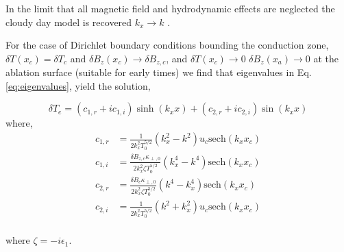 \documentclass[aip,reprint]{revtex4-1}
\begin{document}
In the limit that all magnetic field and hydrodynamic effects are neglected the cloudy day model is recovered $k_x \rightarrow k$ \cite{Bodner1974}.

For the case of Dirichlet boundary conditions bounding the conduction zone, $\delta T(x_c) = \delta T_{c}$ and $\delta B_{z}(x_c) \rightarrow \delta B_{z,c}$, and $\delta T(x_c) \rightarrow 0$ $\delta B_z(x_a) \rightarrow 0$  at the ablation surface (suitable for early times) we find that eigenvalues in Eq. \ref{eq:eigenvalues}, yield the solution,

 \begin{equation}
 \delta T_{e} = (c_{1,r} + i c_{1,i}) \sinh(k_x x) + (c_{2,r} + i c_{2,i}) \sin (k_x x)
\end{equation}
where, 
\begin{eqnarray}
c_{1,r} &= \frac{1}{2k_x^2 T_0^{5/2}}(k_x^2 - k^2) u_c \mbox{sech}(k_x x_c) \\
c_{1,i} &= \frac{\delta B_{z,c} \kappa_{\perp,0}}{2k_x ^2 \zeta T_0^{5/2} }(k_x^4 - k^4 ) \mbox{sech}(k_x x_c)\\
c_{2,r} &= \frac{\delta B_{c} \kappa_{\perp,0}}{2k_x^2 \zeta T_0^{5/2}}(k^4 -k_x^4) \mbox{sech}(k_x x_c)\\
c_{2,i} &= \frac{1}{2k_x^2 T_0^{5/2}}(k^2 +k_x^2) u_c \mbox{sech}(k_x x_c)\\
\end{eqnarray}

where $\zeta = -i\epsilon_1$.








%


%

\end{document}
